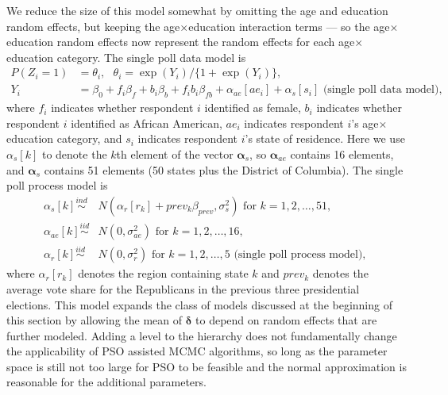 \documentclass[12pt]{article}
\begin{document}
We reduce the size of this model somewhat by omitting the age and education random effects, but keeping the age$\times$education interaction terms --- so the age$\times$education random effects now represent the random effects for each age$\times$education category. The single poll data model is
\begin{align}
P(Z_i = 1) &= \theta_i,\ \ \   \theta_i = \exp(Y_i)/\{1 + \exp(Y_i)\}, \nonumber\\
Y_i &= \beta_0 + f_i\beta_f + b_i\beta_b + f_ib_i\beta_{fb} + \alpha_{ae}[ae_i] + \alpha_{s}[s_i]\mbox{\ \ \ \ (single poll data model), }
\end{align}
where $f_i$ indicates whether respondent $i$ identified as female, $b_i$ indicates whether respondent $i$ identified as African American, $ae_i$ indicates respondent $i$'s age$\times$education category, and $s_i$ indicates respondent $i$'s state of residence. Here we use $\alpha_{s}[k]$ to denote the $k$th element of the vector $\bm{\alpha}_s$, so $\bm{\alpha}_{ae}$ contains 16 elements, and $\bm{\alpha}_s$ contains 51 elements (50 states plus the District of Columbia). The single poll process model is
\begin{align}
\alpha_s[k] \stackrel{ind}{\sim}& N(\alpha_r[r_k] + prev_k\beta_{prev}, \sigma^2_s) \mbox{ for } k=1,2,\dots,51,\nonumber\\
\alpha_{ae}[k] \stackrel{iid}{\sim}& N(0, \sigma^2_{ae}) \mbox{ for } k=1,2,\dots,16,\nonumber\\
\alpha_{r}[k] \stackrel{iid}{\sim}& N(0, \sigma^2_{r}) \mbox{ for } k=1,2,\dots,5 \mbox{\ \ \ \ (single poll process model), }
\end{align}
where $\alpha_r[r_k]$ denotes the region containing state $k$ and $prev_k$ denotes the average vote share for the Republicans in the previous three presidential elections. This model expands the class of models discussed at the beginning of this section by allowing the mean of $\bm{\delta}$ to depend on random effects that are further modeled. Adding a level to the hierarchy does not fundamentally change the applicability of PSO assisted MCMC algorithms, so long as the parameter space is still not too large for PSO to be feasible and the normal approximation is reasonable for the additional parameters.
\end{document}
